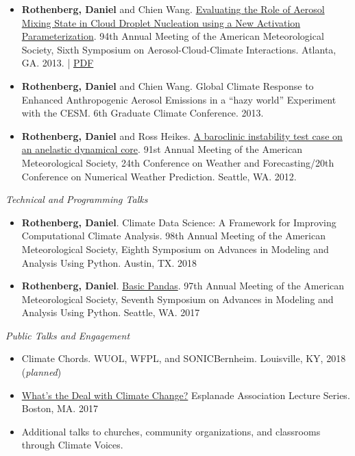 \documentclass[11pt,letterpaper]{article}
\begin{document}
\begin{itemize}[itemindent=-10pt]
 \item \textbf{Rothenberg, Daniel} and Chien Wang. \href{https://ams.confex.com/ams/94Annual/webprogram/Paper240205.html}{Evaluating the Role of Aerosol Mixing State in Cloud Droplet Nucleation using a New Activation Parameterization}. 94th Annual Meeting of the American Meteorological Society, Sixth Symposium on Aerosol-Cloud-Climate Interactions. Atlanta, GA. 2013. | \href{https://figshare.com/articles/AMS_2014_Evaluating_the_Role_of_Aerosol_Mixing_State_in_Cloud_Droplet_Nucleation_towards_Developing_a_New_Activation_Parameterization/918655}{PDF}

 \item \textbf{Rothenberg, Daniel} and Chien Wang. Global Climate Response to Enhanced Anthropogenic Aerosol Emissions in a ``hazy world'' Experiment with the CESM. 6th Graduate Climate Conference. 2013.

 \item \textbf{Rothenberg, Daniel} and Ross Heikes. \href{https://ams.confex.com/ams/91Annual/webprogram/Paper180796.html}{A baroclinic instability test case on an anelastic dynamical core}. 91st Annual Meeting of the American Meteorological Society, 24th Conference on Weather and Forecasting/20th Conference on Numerical Weather Prediction. Seattle, WA. 2012.
\end{itemize}


\bigskip
\emph{Technical and Programming Talks}
\medskip
\begin{itemize}[itemindent=-10pt]

 \item \textbf{Rothenberg, Daniel}. Climate Data Science: A Framework for Improving Computational Climate Analysis. 98th Annual Meeting of the American Meteorological Society, Eighth Symposium on Advances in Modeling and Analysis Using Python. Austin, TX. 2018

 \item \textbf{Rothenberg, Daniel}. \href{https://github.com/darothen/python_for_climate_data_science/blob/master/basic_pandas.ipynb}{Basic Pandas}. 97th Annual Meeting of the American Meteorological Society, Seventh Symposium on Advances in Modeling and Analysis Using Python. Seattle, WA. 2017

\end{itemize}


\bigskip
\emph{Public Talks and Engagement}
\medskip
\begin{itemize}[itemindent=-10pt]

 \item Climate Chords. WUOL, WFPL, and SONICBernheim. Louisville, KY, 2018 (\emph{planned})

 \item  \href{https://docs.google.com/presentation/d/158WNGamjcRgUr1TvOVVixOQXRt1uc2kUyYe5a6D9ICA/edit?usp=drive_web}{What's the Deal with Climate Change?} Esplanade Association Lecture Series. Boston, MA. 2017

 \item Additional talks to churches, community organizations, and classrooms through Climate Voices.

\end{itemize}
\end{document}
